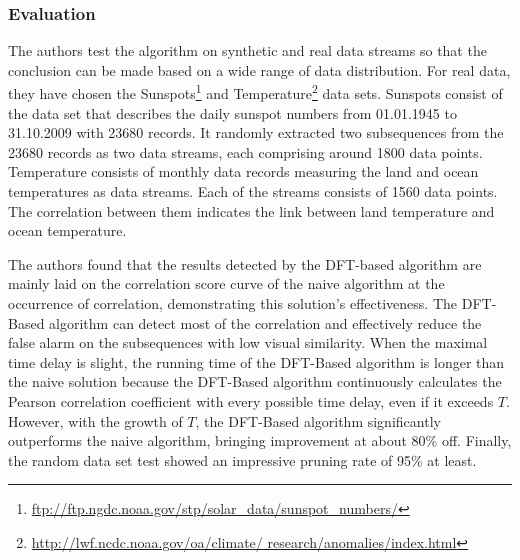 \subsubsection{Evaluation}
The authors test the algorithm on synthetic and real data streams so that the conclusion can be made based on a wide range of data distribution. For real data, they have chosen the Sunspots\footnote{\href{ftp://ftp.ngdc.noaa.gov/STP/SOLAR_DATA/SUNSPOT_NUMBERS/}{ftp://ftp.ngdc.noaa.gov/stp/solar\_data/sunspot\_numbers/}} and Temperature\footnote{\href{http://lwf.ncdc.noaa.gov/oa/climate/ research/anomalies/index.html}{http://lwf.ncdc.noaa.gov/oa/climate/ research/anomalies/index.html}} data sets. Sunspots consist of the data set that describes the daily sunspot numbers from 01.01.1945 to 31.10.2009 with 23680 records. It randomly extracted two subsequences from the 23680 records as two data streams, each comprising around 1800 data points. Temperature consists of monthly data records measuring the land and ocean temperatures as data streams. Each of the streams consists of 1560 data points. The correlation between them indicates the link between land temperature and ocean temperature. \newline

The authors found that the results detected by the DFT-based algorithm are mainly laid on the correlation score curve of the naive algorithm at the occurrence of correlation, demonstrating this solution's effectiveness. The DFT-Based algorithm can detect most of the correlation and effectively reduce the false alarm on the subsequences with low visual similarity. When the maximal time delay is slight, the running time of the DFT-Based algorithm is longer than the naive solution because the DFT-Based algorithm continuously calculates the Pearson correlation coefficient with every possible time delay, even if it exceeds $T$. However, with the growth of $T$, the DFT-Based algorithm significantly outperforms the naive algorithm, bringing improvement at about 80\% off. Finally, the random data set test showed an impressive pruning rate of 95\% at least. 

